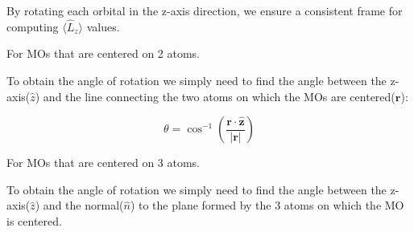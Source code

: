 \documentclass{article}
\begin{document}
\begin{itemize}
By rotating each orbital in the z-axis direction, we ensure a consistent frame for computing $\langle \hat{L}_z \rangle$ values.

\begin{tcolorbox}[colback=blue!5!white, colframe=brown!75!black, title=Important Note]
For MOs that are centered on 2 atoms.
\end{tcolorbox}

To obtain the angle of rotation we simply need to find the angle between the z-axis($\textbf{$\hat{z}$}$) and the line connecting the two atoms on which the MOs are centered($\textbf{r}$):

\[
\theta = \cos^{-1}\left( \frac{ \mathbf{r} \cdot \hat{\mathbf{z}} }{ \left| \mathbf{r} \right| } \right)
\]

\begin{tcolorbox}[colback=blue!5!white, colframe=brown!75!black, title=Important Note]
For MOs that are centered on 3 atoms.
\end{tcolorbox}

To obtain the angle of rotation we simply need to find the angle between the z-axis($\textbf{$\hat{z}$}$) and the normal($\textbf{$\hat{n}$}$) to the plane formed by the 3 atoms on which the MO is centered.

\begin{center}
\end{center}
\end{itemize}
\end{document}
